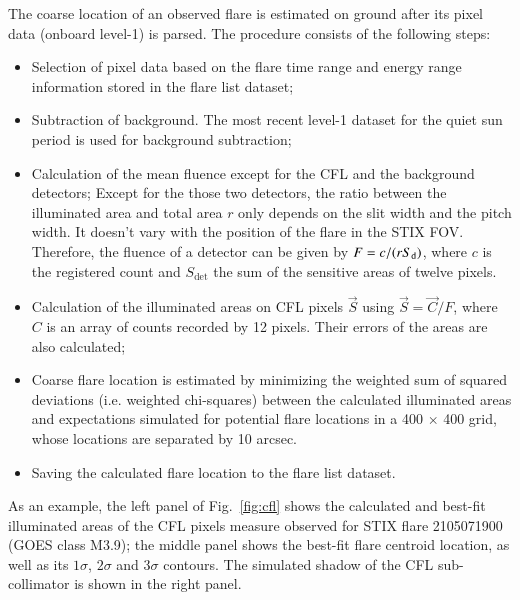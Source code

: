 \documentclass{aa}
\begin{document}
The coarse location of an observed flare is estimated on ground after its pixel data (onboard level-1) is parsed.
The procedure consists of the following steps:
\begin{itemize}
  \item Selection of pixel data based on the flare time range and energy range information stored in the flare list dataset;
  \item Subtraction of background. The most recent level-1 dataset for the quiet sun period is used for background subtraction;
  \item Calculation of the mean fluence except for the CFL and the background detectors; 
      Except for the those two detectors, the ratio between the illuminated area and total area $r$ only depends on the 
      slit width and the pitch width. It doesn't vary with the position of the flare in the STIX FOV.  
      Therefore, the fluence of a detector can be given by $F=c/(r S_{\rm d})$,  where $c$ is the registered 
      count and $S_\textrm{det}$ the sum of the sensitive areas of twelve pixels. 
  \item Calculation of the illuminated areas on CFL pixels $\vec{S}$ using $\vec{S} = \vec{C}/F$, where $C$  is an array of counts 
  recorded by 12 pixels. Their errors of the areas are also calculated; 
  \item  Coarse flare location is estimated by minimizing the weighted sum of squared deviations 
  (i.e. weighted chi-squares) between  the calculated illuminated areas and  expectations
  simulated for potential flare locations in a 400 $\times$ 400 grid, whose locations are separated by 10 arcsec.  
  \item Saving the calculated flare location to the flare list dataset. 
\end{itemize}
As an example, the left panel of Fig.~\ref{fig:cfl} shows the calculated and best-fit illuminated areas 
of the CFL pixels measure observed for STIX flare 2105071900 (GOES class M3.9);   the middle panel shows the best-fit 
flare centroid location, as well as its $1\sigma$, $2\sigma$ and $3\sigma$ contours. 
The simulated shadow of the CFL sub-collimator  is shown in the right panel. 
\end{document}
